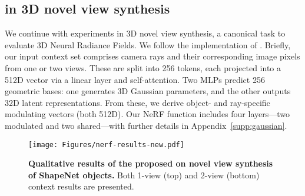 \subsection{\name{} in 3D novel view synthesis}
\label{sec:3d-nerf}
We continue with experiments in 3D novel view synthesis, a canonical task to evaluate 3D Neural Radiance Fields.
%
%
We follow the implementation of \cite{guo2023versatile,chen2022transformers}. Briefly, our input context set comprises camera rays and their corresponding image pixels from one or two views. These are split into 256 tokens, each projected into a 512D vector via a linear layer and self-attention. Two MLPs predict 256 geometric bases: one generates 3D Gaussian parameters, and the other outputs 32D latent representations. From these, we derive object- and ray-specific modulating vectors (both 512D). Our NeRF function includes four layers—two modulated and two shared—with further details in Appendix~\ref{supp:gaussian}.



\begin{figure*}[t]
  \centering
  \texttt{[image: Figures/nerf-results-new.pdf]} %
  \vspace{-6mm}  \caption{\textbf{Qualitative results of the proposed \name{} on novel view synthesis of ShapeNet objects.} Both 1-view (top) and 2-view (bottom) context results are presented.} %
  \label{fig:nerf-visualization}
  \vspace{-3mm}
\end{figure*}


